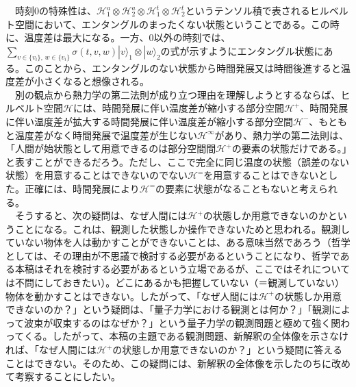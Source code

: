 　時刻$0$の特殊性は、$\mathcal{H}_1^a \otimes \mathcal{H}_2^a \otimes \mathcal{H}_1^t \otimes \mathcal{H}_2^t$というテンソル積で表されるヒルベルト空間において、エンタングルのまったくない状態ということである。この時に、温度差は最大になる。一方、$0$以外の時刻では、$\sum_{v \in \{v_i\} ,\, w \in \{v_i\}} \sigma(t,v,w)|v\rangle_1 \otimes |w\rangle_2 $の式が示すようにエンタングル状態にある。このことから、エンタングルのない状態から時間発展又は時間後進すると温度差が小さくなると想像される。\\
　別の観点から熱力学の第二法則が成り立つ理由を理解しようとするならば、ヒルベルト空間$\mathcal{H}$には、時間発展に伴い温度差が縮小する部分空間$\mathcal{H}^+$、時間発展に伴い温度差が拡大する時間発展に伴い温度差が縮小する部分空間$\mathcal{H}^-$、もともと温度差がなく時間発展で温度差が生じない$\mathcal{H}^\infty$があり、熱力学の第二法則は、「人間が始状態として用意できるのは部分空間間$\mathcal{H}^+$の要素の状態だけである。」と表すことができるだろう。ただし、ここで完全に同じ温度の状態（誤差のない状態）を用意することはできないのでない$\mathcal{H}^=$を用意することはできないとした。正確には、時間発展により$\mathcal{H}^=$の要素に状態がなることもないと考えられる。\\
　そうすると、次の疑問は、なぜ人間には$\mathcal{H}^+$の状態しか用意できないのかということになる。これは、観測した状態しか操作できないためと思われる。観測していない物体を人は動かすことができないことは、ある意味当然であろう（哲学としては、その理由が不思議で検討する必要があるということになり、哲学である本稿はそれを検討する必要があるという立場であるが、ここではそれについては不問にしておきたい）。どこにあるかも把握していない（＝観測していない）物体を動かすことはできない。したがって、「なぜ人間には$\mathcal{H}^+$の状態しか用意できないのか？」という疑問は、「量子力学における観測とは何か？」「観測によって波束が収束するのはなぜか？」という量子力学の観測問題と極めて強く関わってくる。したがって、本稿の主題である観測問題、新解釈の全体像を示さなければ、「なぜ人間には$\mathcal{H}^+$の状態しか用意できないのか？」という疑問に答えることはできない。そのため、この疑問には、新解釈の全体像を示したのちに改めて考察することにしたい。